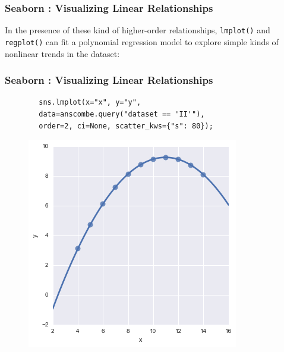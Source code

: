 \documentclass{beamer}
\begin{document}
\begin{frame}[fragile]
	\frametitle{Seaborn : Visualizing Linear Relationships}
	\large	
	In the presence of these kind of higher-order relationships, \texttt{lmplot()} and \texttt{regplot()} can fit a polynomial regression model to explore simple kinds of nonlinear trends in the dataset:
	
\end{frame}
\begin{frame}[fragile]
	\frametitle{Seaborn : Visualizing Linear Relationships}
	\large
	\begin{framed}
		\begin{verbatim}
		sns.lmplot(x="x", y="y", 
		data=anscombe.query("dataset == 'II'"),
		order=2, ci=None, scatter_kws={"s": 80});
		\end{verbatim}
	\end{framed}
	\begin{figure}
		\centering
		\includegraphics[width=0.55\linewidth]{images/regression_23_0}
		
	\end{figure}
	
\end{frame}
\end{document}
